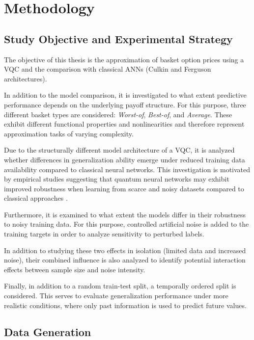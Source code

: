 \chapter{Methodology}

\section{Study Objective and Experimental Strategy}

The objective of this thesis is the approximation of basket option prices using a VQC and the comparison with classical ANNs (Culkin and Ferguson architectures).

In addition to the model comparison, it is investigated to what extent predictive performance depends on the underlying payoff structure. For this purpose, three different basket types are considered: \textit{Worst-of}, \textit{Best-of}, and \textit{Average}. These exhibit different functional properties and nonlinearities and therefore represent approximation tasks of varying complexity.

Due to the structurally different model architecture of a VQC, it is analyzed whether differences in generalization ability emerge under reduced training data availability compared to classical neural networks. 
This investigation is motivated by empirical studies suggesting that quantum neural networks may exhibit improved robustness when learning from scarce and noisy datasets compared to classical approaches \cite{stein2023benchmarking}.

Furthermore, it is examined to what extent the models differ in their robustness to noisy training data. For this purpose, controlled artificial noise is added to the training targets in order to analyze sensitivity to perturbed labels.

In addition to studying these two effects in isolation (limited data and increased noise), their combined influence is also analyzed to identify potential interaction effects between sample size and noise intensity.

Finally, in addition to a random train-test split, a temporally ordered split is considered. This serves to evaluate generalization performance under more realistic conditions, where only past information is used to predict future values.

\section{Data Generation}
\label{sec:mt-data-generation}

